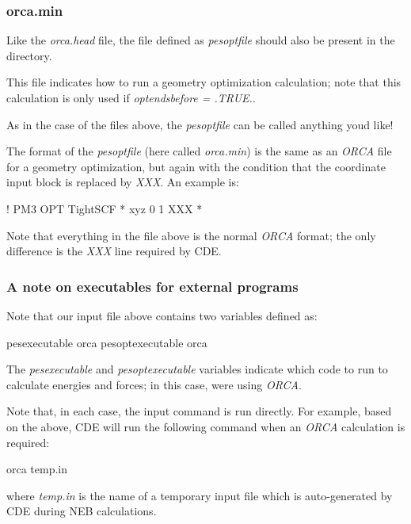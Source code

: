 \subsubsection*{orca.\+min}

Like the {\itshape orca.\+head} file, the file defined as {\itshape pesoptfile} should also be present in the directory.

This file indicates how to run a geometry optimization calculation; note that this calculation is only used if {\itshape optendsbefore = .T\+R\+UE.}.

As in the case of the files above, the {\itshape pesoptfile} can be called anything you\textquotesingle{}d like!

The format of the {\itshape pesoptfile} (here called {\itshape orca.\+min}) is the same as an {\itshape O\+R\+CA} file for a geometry optimization, but again with the condition that the coordinate input block is replaced by {\itshape X\+XX}. An example is\+: \begin{DoxyVerb}! PM3 OPT TightSCF
* xyz 0 1
XXX
*
\end{DoxyVerb}


Note that everything in the file above is the normal {\itshape O\+R\+CA} format; the only difference is the {\itshape X\+XX} line required by C\+DE.

\subsubsection*{A note on executables for external programs}

Note that our input file above contains two variables defined as\+: \begin{DoxyVerb}  pesexecutable orca
  pesoptexecutable orca
\end{DoxyVerb}


The {\itshape pesexecutable} and {\itshape pesoptexecutable} variables indicate which code to run to calculate energies and forces; in this case, we\textquotesingle{}re using {\itshape O\+R\+CA}.

Note that, in each case, the input command is run directly. For example, based on the above, C\+DE will run the following command when an {\itshape O\+R\+CA} calculation is required\+: \begin{DoxyVerb}orca temp.in
\end{DoxyVerb}


where {\itshape temp.\+in} is the name of a temporary input file which is auto-\/generated by C\+DE during N\+EB calculations.

